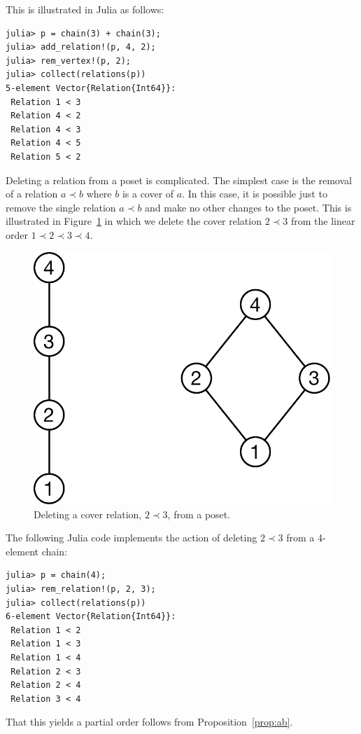 \documentclass[12pt]{article}
\begin{document}
This is illustrated in Julia as follows:
{\small
\begin{verbatim}
julia> p = chain(3) + chain(3);
julia> add_relation!(p, 4, 2);
julia> rem_vertex!(p, 2);
julia> collect(relations(p))
5-element Vector{Relation{Int64}}:
 Relation 1 < 3
 Relation 4 < 2
 Relation 4 < 3
 Relation 4 < 5
 Relation 5 < 2
\end{verbatim}
}

\bigbreak
{}

Deleting a relation from a poset is complicated. The simplest case is
the removal of a relation $a \prec b$ where $b$ is a cover of $a$. In
this case, it is possible just to remove the single relation $a \prec
b$ and make no other changes to the poset. This is illustrated in
Figure~\ref{fig:cover-edge-deletion} in which we delete the cover
relation $2\prec3$ from the linear order $1\prec2\prec3\prec4$. 
\begin{figure}[h]
  \begin{framed}
    \begin{center}
      \includegraphics[scale=0.4]{cover-edge-deletion}
    \end{center}
    \caption{Deleting a cover relation, $2\prec3$, from a poset.}
    \label{fig:cover-edge-deletion}
  \end{framed}
\end{figure}

The following Julia code implements the action of deleting $2 \prec 3$
from a 4-element chain:
{\small
\begin{verbatim}
julia> p = chain(4);
julia> rem_relation!(p, 2, 3);
julia> collect(relations(p))
6-element Vector{Relation{Int64}}:
 Relation 1 < 2
 Relation 1 < 3
 Relation 1 < 4
 Relation 2 < 3
 Relation 2 < 4
 Relation 3 < 4
\end{verbatim}
} 
That this yields a partial order follows from
Proposition~\ref{prop:ab}.
\end{document}
